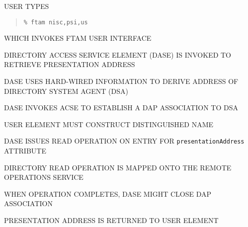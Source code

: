 \begin{bwslide}

\begin{nrtc}
\item	USER TYPES
\begin{quote}\small\begin{verbatim}
% ftam nisc,psi,us
\end{verbatim}\end{quote}
	WHICH INVOKES FTAM USER INTERFACE
\end{nrtc}
\end{bwslide}




\begin{bwslide}

\begin{nrtc}
\item	DIRECTORY ACCESS SERVICE ELEMENT (DASE) IS INVOKED TO RETRIEVE
	PRESENTATION ADDRESS

\item	DASE USES HARD-WIRED INFORMATION TO DERIVE ADDRESS OF DIRECTORY SYSTEM
	AGENT (DSA)

\item	DASE INVOKES ACSE TO ESTABLISH A DAP ASSOCIATION TO DSA

\item	USER ELEMENT MUST CONSTRUCT DISTINGUISHED NAME
\end{nrtc}
\end{bwslide}


\begin{bwslide}

\begin{nrtc}
\item	DASE ISSUES READ OPERATION ON ENTRY FOR \verb"presentationAddress"
	ATTRIBUTE

\item	DIRECTORY READ OPERATION IS MAPPED ONTO THE REMOTE OPERATIONS SERVICE

\item	WHEN OPERATION COMPLETES, DASE MIGHT CLOSE DAP ASSOCIATION

\item	PRESENTATION ADDRESS IS RETURNED TO USER ELEMENT
\end{nrtc}
\end{bwslide}


